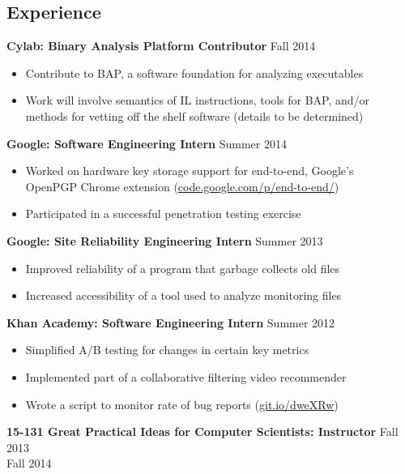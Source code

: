 \documentclass[margin]{res}
\begin{document}
\begin{resume}
\section{Experience}
  \textbf{Cylab: Binary Analysis Platform Contributor} \hfill Fall 2014
  \begin{itemize} \itemsep -2pt  %
    \item Contribute to BAP, a software foundation for analyzing executables
    \item Work will involve semantics of IL instructions, tools for BAP, and/or\\
      methods for vetting off the shelf software (details to be determined)
  \end{itemize}

  \textbf{Google: Software Engineering Intern} \hfill Summer 2014
  \begin{itemize} \itemsep -2pt  %
    \item Worked on hardware key storage support for end-to-end, Google's\\
      OpenPGP Chrome extension
      (\href{https://code.google.com/p/end-to-end/}{code.google.com/p/end-to-end/})
    \item Participated in a successful penetration testing exercise
  \end{itemize}
  \textbf{Google: Site Reliability Engineering Intern}
    \hfill Summer 2013
  \begin{itemize} \itemsep -2pt  %
    \item Improved reliability of a program that garbage collects old files
    \item Increased accessibility of a tool used to analyze monitoring files
  \end{itemize}

  \textbf{Khan Academy: Software Engineering Intern} \hfill Summer 2012
  \begin{itemize} \itemsep -2pt %
  \item Simplified A/B testing for changes in certain key metrics
  \item Implemented part of a collaborative filtering video recommender
  \item Wrote a script to monitor rate of bug reports
    (\href{https://github.com/Khan/beep-boop}{git.io/dweXRw})
  \end{itemize}

  \textbf{15-131 Great Practical Ideas for Computer Scientists: Instructor}
    \hfill Fall 2013 \\ \hphantom{1em} \hfill Fall 2014


\end{resume}
\end{document}
